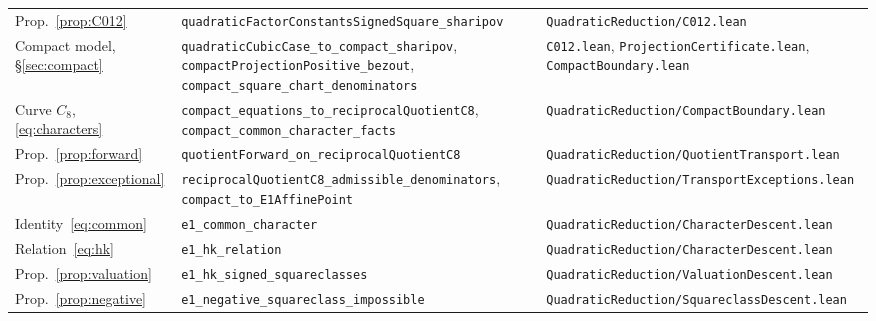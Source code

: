 \documentclass[10pt]{article}
\theoremstyle{definition}
\theoremstyle{remark}
\begin{document}
\begin{small}
\begin{longtable}{@{}p{3.6cm}p{6.3cm}p{5.4cm}@{}}
Prop.~\ref{prop:C012} & \texttt{quadratic\allowbreak Factor\allowbreak Constants\allowbreak Signed\allowbreak Square\_\allowbreak sharipov} & \texttt{Quadratic\allowbreak Reduction/\allowbreak C012.\allowbreak lean}\\
Compact model, \S\ref{sec:compact} & \texttt{quadratic\allowbreak Cubic\allowbreak Case\_\allowbreak to\_\allowbreak compact\_\allowbreak sharipov}, \texttt{compact\allowbreak Projection\allowbreak Positive\_\allowbreak bezout}, \texttt{compact\_\allowbreak square\_\allowbreak chart\_\allowbreak denominators} & \texttt{C012.\allowbreak lean}, \texttt{Projection\allowbreak Certificate.\allowbreak lean}, \texttt{Compact\allowbreak Boundary.\allowbreak lean}\\
Curve $C_8$, \eqref{eq:characters} & \texttt{compact\_\allowbreak equations\_\allowbreak to\_\allowbreak reciprocal\allowbreak Quotient\allowbreak C8}, \texttt{compact\_\allowbreak common\_\allowbreak character\_\allowbreak facts} & \texttt{Quadratic\allowbreak Reduction/\allowbreak Compact\allowbreak Boundary.\allowbreak lean}\\
Prop.~\ref{prop:forward} & \texttt{quotient\allowbreak Forward\_\allowbreak on\_\allowbreak reciprocal\allowbreak Quotient\allowbreak C8} & \texttt{Quadratic\allowbreak Reduction/\allowbreak Quotient\allowbreak Transport.\allowbreak lean}\\
Prop.~\ref{prop:exceptional} & \texttt{reciprocal\allowbreak Quotient\allowbreak C8\_\allowbreak admissible\_\allowbreak denominators}, \texttt{compact\_\allowbreak to\_\allowbreak E1\allowbreak Affine\allowbreak Point} & \texttt{Quadratic\allowbreak Reduction/\allowbreak Transport\allowbreak Exceptions.\allowbreak lean}\\
Identity~\eqref{eq:common} & \texttt{e1\_\allowbreak common\_\allowbreak character} & \texttt{Quadratic\allowbreak Reduction/\allowbreak Character\allowbreak Descent.\allowbreak lean}\\
Relation~\eqref{eq:hk} & \texttt{e1\_\allowbreak hk\_\allowbreak relation} & \texttt{Quadratic\allowbreak Reduction/\allowbreak Character\allowbreak Descent.\allowbreak lean}\\
Prop.~\ref{prop:valuation} & \texttt{e1\_\allowbreak hk\_\allowbreak signed\_\allowbreak squareclasses} & \texttt{Quadratic\allowbreak Reduction/\allowbreak Valuation\allowbreak Descent.\allowbreak lean}\\
Prop.~\ref{prop:negative} & \texttt{e1\_\allowbreak negative\_\allowbreak squareclass\_\allowbreak impossible} & \texttt{Quadratic\allowbreak Reduction/\allowbreak Squareclass\allowbreak Descent.\allowbreak lean}\\

\end{longtable}
\end{small}
\end{document}

